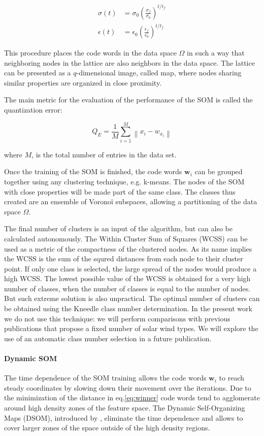 \begin{align}
\sigma(t) & = \sigma_0 \left(\frac{\sigma_f}{\sigma_0}\right)^{t/t_f} \label{eq:sigma} \\
\epsilon(t) & = \epsilon_0 \left(\frac{\epsilon_f}{\epsilon_0}\right)^{t/t_f} \label{eq:epsilon}
\end{align}

This procedure places the code words in the data space $\Omega$ in such a way that neighboring nodes in the lattice are also neighbors in the data space. The lattice can be presented as a $q$-dimensional image, called map, where nodes sharing similar properties are organized in close proximity.

The main metric for the evaluation of the performance of the SOM is called the quantization error:

\begin{equation}
Q_E = \frac{1}{M} \sum_{i=1}^M \left\lVert x_i - w_{x_i} \right\rVert
\end{equation}

where $M$, is the total number of entries in the data set.

Once the training of the SOM is finished, the code words $\boldsymbol{w}_i$ can be grouped together using any clustering technique, e.g. k-means. The nodes of the SOM with close properties will be made part of the same class. The classes thus created are an ensemble of Vorono\"i subspaces, allowing a partitioning of the data space $\Omega$.

The final number of clusters is an input of the algorithm, but can also be calculated autonomously. The Within Cluster Sum of Squares (WCSS) can be used as a metric of the compactness of the clustered nodes. As its name implies the WCSS is the sum of the squred distances from each node to their cluster point. If only one class is selected, the large spread of the nodes would produce a high WCSS. The lowest possible value of the WCSS is obtained for a very high number of classes, when the number of classes is equal to the number of nodes. But such extreme solution is also unpractical. The optimal number of clusters can be obtained using the Kneedle class number determination\citep{5961514}. In the present work we do not use this technique: we will perform comparisons with previous publications that propose a fixed number of solar wind types. We will explore the use of an automatic class number selection in a future publication.

\paragraph{Dynamic SOM}
The time dependence of the SOM training allows the code words $\boldsymbol{w}_i$ to reach steady coordinates by slowing down their movement over the iterations. Due to the minimization of the distance in eq.\eqref{eq:winner} code words tend to agglomerate around high density zones of the feature space. The Dynamic Self-Organizing Maps (DSOM), introduced by \citep{Rougier2011}, eliminate the time dependence and allows to cover larger zones of the space outside of the high density regions.

